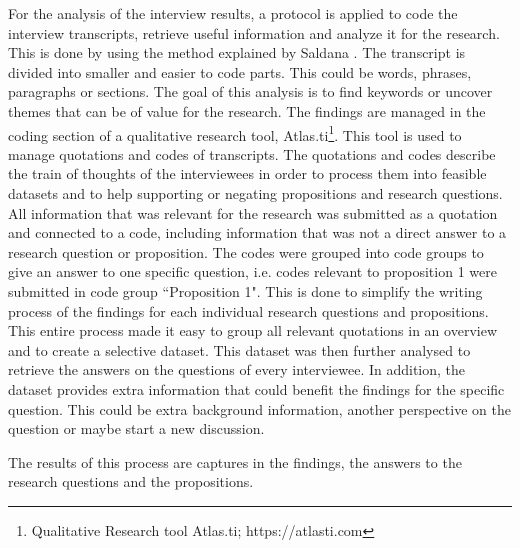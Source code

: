  For the analysis of the interview results, a protocol is applied to code the interview transcripts, retrieve useful information and analyze it for the research. This is done by using the method explained by Saldana \cite{saldana2015coding}. The transcript is divided into smaller and easier to code parts. This could be words, phrases, paragraphs or sections. The goal of this analysis is to find keywords or uncover themes that can be of value for the research. The findings are managed in the coding section of a qualitative research tool, Atlas.ti\footnote{Qualitative Research tool Atlas.ti; https://atlasti.com}. 
This tool is used to manage quotations and codes of transcripts. The quotations and codes describe the train of thoughts of the interviewees in order to process them into feasible datasets and to help supporting or negating propositions and research questions. All information that was relevant for the research was submitted as a quotation and connected to a code, including information that was not a direct answer to a research question or proposition. The codes were grouped into code groups to give an answer to one specific question, i.e. codes relevant to proposition 1 were submitted in code group ``Proposition 1". This is done to simplify the writing process of the findings for each individual research questions and propositions. This entire process made it easy to group all relevant quotations in an overview and to create a selective dataset.  This dataset was then further analysed to retrieve the answers on the questions of every interviewee. In addition, the dataset provides extra information that could benefit the findings for the specific question. This could be extra background information, another perspective on the question or maybe start a new discussion. 

The results of this process are captures in the findings, the answers to the research questions and the propositions.


